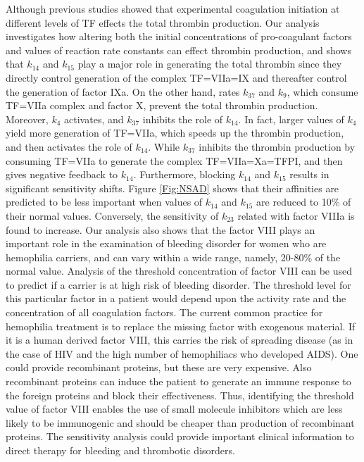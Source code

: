 Although previous studies showed that experimental coagulation
initiation at different levels of TF effects the total thrombin
production. Our analysis investigates how altering both the initial
concentrations of pro-coagulant factors and values of reaction rate
constants can effect thrombin production, and shows that $k_{14}$
and $k_{15}$ play a major role in generating the total thrombin
since they directly control generation of the complex TF=VIIa=IX and
thereafter control the generation of factor IXa. On the other hand,
rates $k_{37}$ and $k_9$, which consume TF=VIIa complex and factor
X, prevent the total thrombin production. Moreover, $k_{4}$
activates, and $k_{37}$ inhibits the role of $k_{14}$. In fact,
larger values of $k_4$ yield more generation of TF=VIIa, which
speeds up the thrombin production, and then activates the role of
$k_{14}$. While $k_{37}$ inhibits the thrombin production by
consuming TF=VIIa to generate the complex TF=VIIa=Xa=TFPI, and then
gives negative feedback to $k_{14}$. Furthermore, blocking $k_{14}$
and $k_{15}$ results in significant sensitivity shifts. Figure
\ref{Fig:NSAD} shows that their affinities are predicted to be less
important when values of $k_{14}$ and $k_{15}$ are reduced to 10\%
of their normal values. Conversely, the sensitivity of $k_{23}$
related with factor VIIIa is found to increase.
 Our analysis also shows that the factor VIII plays an
important role in the examination of bleeding disorder for women who
are hemophilia carriers, and can vary within a wide range, namely,
20-80\% of the normal value. Analysis of the threshold concentration
of factor VIII can be used to predict if a carrier is at high risk
of bleeding disorder. The threshold level for this particular factor
in a patient would depend upon the activity rate and the
concentration of all coagulation factors. The current common
practice for hemophilia treatment is to replace the missing factor
with exogenous material. If it is a human derived factor VIII, this
carries the risk of spreading disease (as in the case of HIV and the
high number of hemophiliacs who developed AIDS). One could provide
recombinant proteins, but these are very expensive. Also recombinant
proteins can induce the patient to generate an immune response to
the foreign proteins and block their effectiveness. Thus,
identifying the threshold value of factor VIII enables the use of
small molecule inhibitors which are less likely to be immunogenic
and should be cheaper than production of recombinant proteins. The
sensitivity analysis could provide important clinical information to
direct therapy for bleeding and thrombotic disorders.

